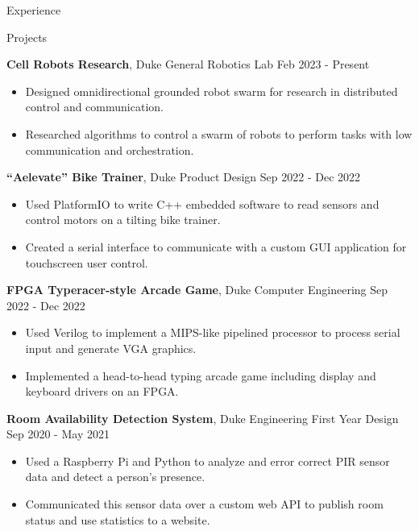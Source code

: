 \documentclass{resume}
\begin{document}
\begin{rSection}{Experience}



\end{rSection} 


\begin{rSection}{Projects}

\textbf{Cell Robots Research}, Duke General Robotics Lab \hfill{Feb 2023 - Present}
\begin{itemize}
    \item Designed omnidirectional grounded robot swarm for research in distributed control and communication.
    \item Researched algorithms to control a swarm of robots to perform tasks with low communication and orchestration.
\end{itemize}

\textbf{``Aelevate'' Bike Trainer}, Duke Product Design \hfill{Sep 2022 - Dec 2022}
\begin{itemize}
    \itemsep -3pt {} 
    \item Used PlatformIO to write C++ embedded software to read sensors and control motors on a tilting bike trainer.
    \item Created a serial interface to communicate with a custom GUI application for touchscreen user control.
\end{itemize}

\textbf{FPGA Typeracer-style Arcade Game}, Duke Computer Engineering \hfill{Sep 2022 - Dec 2022}
\begin{itemize}
    \itemsep -3pt {} 
    \item Used Verilog to implement a MIPS-like pipelined processor to process serial input and generate VGA graphics.
    \item Implemented a head-to-head typing arcade game including display and keyboard drivers on an FPGA.
\end{itemize}

\textbf{Room Availability Detection System}, Duke Engineering First Year Design \hfill{Sep 2020 - May 2021}
\begin{itemize}
    \itemsep -3pt {} 
    \item Used a Raspberry Pi and Python to analyze and error correct PIR sensor data and detect a person's presence.
    \item Communicated this sensor data over a custom web API to publish room status and use statistics to a website.
\end{itemize}

\end{rSection} 
\end{document}
